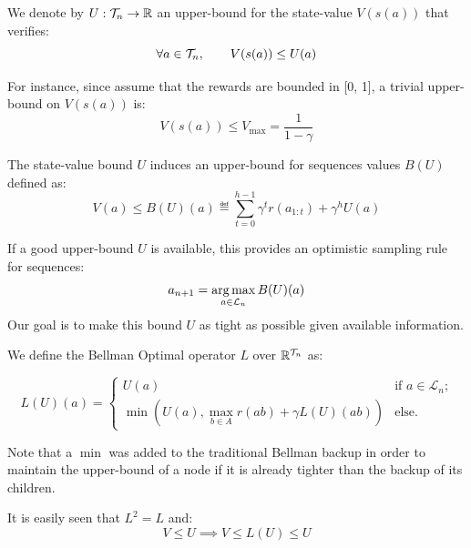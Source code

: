 \documentclass{article}
\begin{document}
\begin{definition}

We denote by $U:\mathcal{T}_n \rightarrow \mathbb{R}$ an upper-bound for the state-value $V(s(a))$ that verifies:
\begin{equation*}
    \forall a\in\mathcal{T}_n, \qquad V(s(a)) \leq U(a)
\end{equation*}

For instance, since assume that the rewards are bounded in [0, 1], a trivial upper-bound on $V(s(a))$ is:
\[V(s(a)) \leq V_{\max} = \frac{1}{1-\gamma} \]

The state-value bound $U$ induces an upper-bound for sequences values $B(U)$ defined as:
\begin{equation}
\label{eq:sequence_value}
    V(a) \leq B(U)(a) \eqdef \sum_{t=0}^{h-1} \gamma^t r(a_{1:t}) + \gamma^{h} U(a)
\end{equation}
\end{definition}

If a good upper-bound $U$ is available, this provides an optimistic sampling rule for sequences:
\begin{equation}
    \label{eq:sampling_rule}
    a_{n+1} = \operatorname*{arg\,max}_{a\in\mathcal{L}_n} B(U)(a)
\end{equation}
Our goal is to make this bound $U$ as tight as possible given available information.

\begin{definition}
We define the Bellman Optimal operator $L$ over $\mathbb{R}^{\mathcal{T}_n}$ as:

\begin{equation}
    L(U)(a) = \begin{cases}
    U(a) & \text{if $a\in\mathcal{L}_n$;} \\
    \min(U(a), \max_{b\in A} r(ab) + \gamma L(U)({ab}))
    & \text{else.}
    \end{cases}
\end{equation}

Note that a $\min$ was added to the traditional Bellman backup in order to maintain the upper-bound of a node if it is already  tighter than the backup of its children.

It is easily seen that $L^2=L$ and:
\begin{equation*}
    V \leq U \implies V \leq L(U) \leq U
\end{equation*}

\end{definition}
\end{document}
